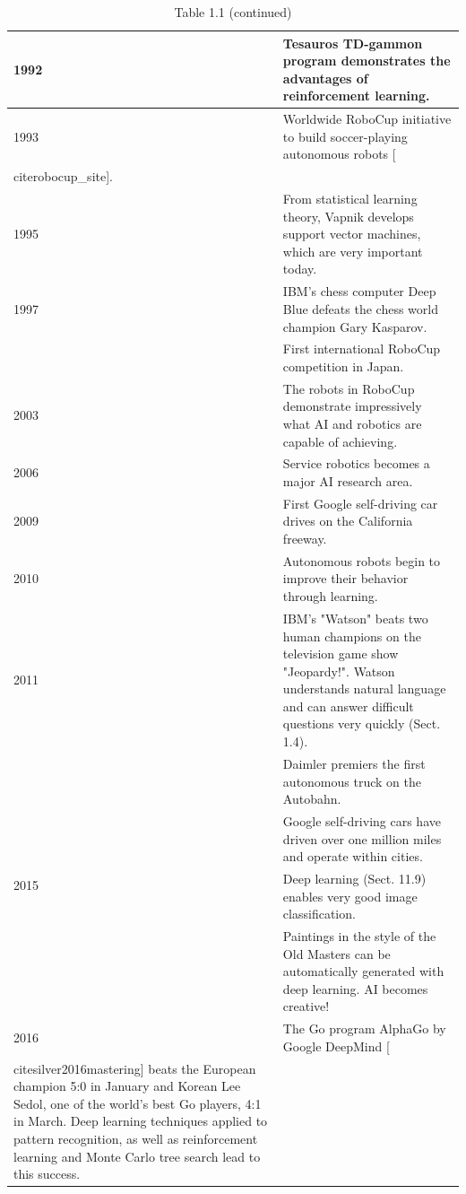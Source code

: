 \documentclass[10pt]{book}
\begin{document}
\begin{table}[htbp]
\begin{center}
\captionsetup{labelformat=empty}
\caption{Table 1.1 (continued)}
\begin{tabular}{|l|l|}
\hline
1992 & Tesauros TD-gammon program demonstrates the advantages of reinforcement learning. \\

\hline
1993 & Worldwide RoboCup initiative to build soccer-playing autonomous robots [\\cite{robocup_site}]. \\
\hline
1995 & From statistical learning theory, Vapnik develops support vector machines, which are very important today. \\
\hline
1997 & IBM's chess computer Deep Blue defeats the chess world champion Gary Kasparov. \\
\hline
 & First international RoboCup competition in Japan. \\
\hline
2003 & The robots in RoboCup demonstrate impressively what AI and robotics are capable of achieving. \\
\hline
2006 & Service robotics becomes a major AI research area. \\
\hline
2009 & First Google self-driving car drives on the California freeway. \\
\hline
2010 & Autonomous robots begin to improve their behavior through learning. \\
\hline
2011 & IBM's "Watson" beats two human champions on the television game show "Jeopardy!". Watson understands natural language and can answer difficult questions very quickly (Sect. 1.4). \\
\hline
\multirow[t]{4}{*}{2015} & Daimler premiers the first autonomous truck on the Autobahn. \\
\hline
 & Google self-driving cars have driven over one million miles and operate within cities. \\
\hline
 & Deep learning (Sect. 11.9) enables very good image classification. \\
\hline
 & Paintings in the style of the Old Masters can be automatically generated with deep learning. AI becomes creative! \\
\hline
2016 & The Go program AlphaGo by Google DeepMind [\\cite{silver2016mastering}] beats the European champion 5:0 in January and Korean Lee Sedol, one of the world's best Go players, 4:1 in March. Deep learning techniques applied to pattern recognition, as well as reinforcement learning and Monte Carlo tree search lead to this success. \\
\hline
\end{tabular}
\end{center}
\end{table}
\end{document}
